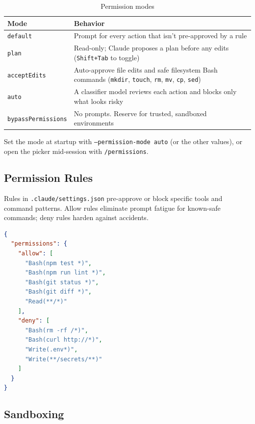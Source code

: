 \begin{table}[ht]
\centering
\caption{Permission modes}
\label{tab:perm-modes}
\begin{tabularx}{\textwidth}{lX}
\toprule
\textbf{Mode} & \textbf{Behavior} \\
\midrule
\texttt{default}           & Prompt for every action that isn't pre-approved by a rule \\
\texttt{plan}              & Read-only; Claude proposes a plan before any edits (\texttt{Shift+Tab} to toggle) \\
\texttt{acceptEdits}       & Auto-approve file edits and safe filesystem Bash commands (\texttt{mkdir}, \texttt{touch}, \texttt{rm}, \texttt{mv}, \texttt{cp}, \texttt{sed}) \\
\texttt{auto}              & A classifier model reviews each action and blocks only what looks risky \\
\texttt{bypassPermissions} & No prompts. Reserve for trusted, sandboxed environments \\
\bottomrule
\end{tabularx}
\end{table}

Set the mode at startup with \texttt{--permission-mode auto} (or the other
values), or open the picker mid-session with \texttt{/permissions}.

\subsection{Permission Rules}


Rules in \texttt{.claude/settings.json} pre-approve or block specific
tools and command patterns. Allow rules eliminate prompt fatigue for
known-safe commands; deny rules harden against accidents.

\begin{lstlisting}[language=json,caption={A team-friendly permissions block}]
{
  "permissions": {
    "allow": [
      "Bash(npm test *)",
      "Bash(npm run lint *)",
      "Bash(git status *)",
      "Bash(git diff *)",
      "Read(**/*)"
    ],
    "deny": [
      "Bash(rm -rf /*)",
      "Bash(curl http://*)",
      "Write(.env*)",
      "Write(**/secrets/**)"
    ]
  }
}
\end{lstlisting}

\subsection{Sandboxing}

